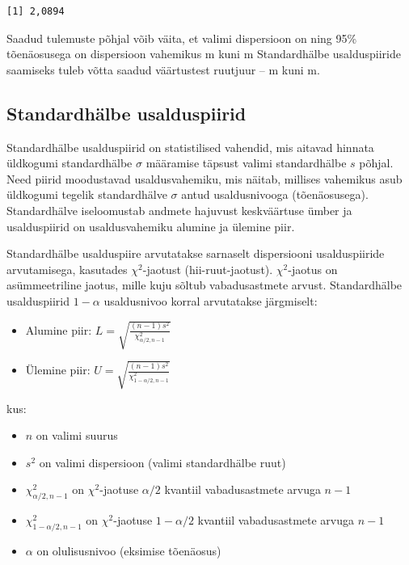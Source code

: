 \documentclass[
]{book}
\providecommand{\tightlist}{%
  \setlength{\itemsep}{0pt}\setlength{\parskip}{0pt}}
\begin{document}
\begin{verbatim}
[1] 2,0894
\end{verbatim}

Saadud tulemuste põhjal võib väita, et valimi dispersioon on  ning 95\% tõenäosusega on dispersioon
vahemikus  m kuni  m Standardhälbe usalduspiiride saamiseks tuleb võtta saadud väärtustest ruutjuur --  m kuni  m.

\subsection{Standardhälbe usalduspiirid}\label{standardhuxe4lbe-usalduspiirid}

Standardhälbe usalduspiirid on statistilised vahendid, mis aitavad hinnata üldkogumi standardhälbe \(\sigma\) määramise täpsust valimi standardhälbe \(s\) põhjal. Need piirid moodustavad usaldusvahemiku, mis näitab, millises vahemikus asub üldkogumi tegelik standardhälve \(\sigma\) antud usaldusnivooga (tõenäosusega). Standardhälve iseloomustab andmete hajuvust keskväärtuse ümber ja usalduspiirid on usaldusvahemiku alumine ja ülemine piir.

Standardhälbe usalduspiire arvutatakse sarnaselt dispersiooni usalduspiiride arvutamisega, kasutades \(\chi^2\)-jaotust (hii-ruut-jaotust). \(\chi^2\)-jaotus on asümmeetriline jaotus, mille kuju sõltub vabadusastmete arvust. Standardhälbe usalduspiirid \(1-\alpha\) usaldusnivoo korral arvutatakse järgmiselt:

\begin{itemize}
\tightlist
\item
  Alumine piir: \(L = \sqrt{\frac{(n-1)s^2}{\chi^2_{\alpha/2, n-1}}}\)
\item
  Ülemine piir: \(U = \sqrt{\frac{(n-1)s^2}{\chi^2_{1-\alpha/2, n-1}}}\)
\end{itemize}

kus:

\begin{itemize}
\tightlist
\item
  \(n\) on valimi suurus
\item
  \(s^2\) on valimi dispersioon (valimi standardhälbe ruut)
\item
  \(\chi^2_{\alpha/2, n-1}\) on \(\chi^2\)-jaotuse \(\alpha/2\) kvantiil vabadusastmete arvuga \(n-1\)
\item
  \(\chi^2_{1-\alpha/2, n-1}\) on \(\chi^2\)-jaotuse \(1-\alpha/2\) kvantiil vabadusastmete arvuga \(n-1\)
\item
  \(\alpha\) on olulisusnivoo (eksimise tõenäosus)
\end{itemize}
\end{document}
